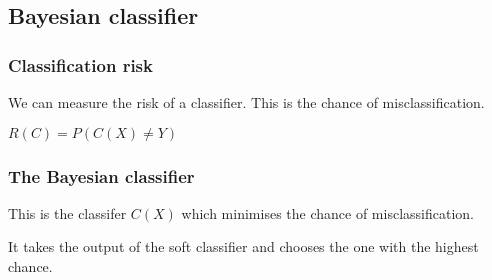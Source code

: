 
\subsection{Bayesian classifier}

\subsubsection{Classification risk}

We can measure the risk of a classifier. This is the chance of misclassification.

\(R(C)=P(C(X)\ne Y)\)

\subsubsection{The Bayesian classifier}

This is the classifer \(C(X)\) which minimises the chance of misclassification.

It takes the output of the soft classifier and chooses the one with the highest chance.

